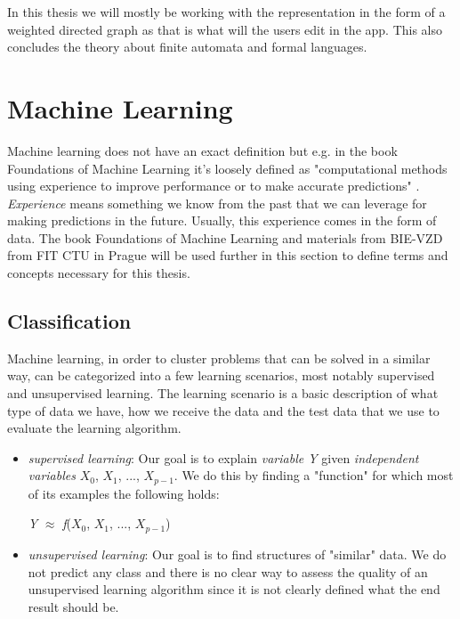 In this thesis we will mostly be working with the representation in the form of a weighted directed graph as that is what will the users edit in the app.
This also concludes the theory about finite automata and formal languages.

\section{Machine Learning}

Machine learning does not have an exact definition but e.g. in the book Foundations of Machine Learning it's loosely defined as "computational methods using experience to improve performance or to make accurate predictions" \cite{ml-foundations}. \textit{Experience} means something we know from the past that we can leverage for making predictions in the future. Usually, this experience comes in the form of data. The book Foundations of Machine Learning \cite{ml-foundations} and materials from BIE-VZD from FIT CTU in Prague \cite{vzd-lectures} will be used further in this section to define terms and concepts necessary for this thesis.

\subsection{Classification}

Machine learning, in order to cluster problems that can be solved in a similar way, can be categorized into a few learning scenarios, most notably supervised and unsupervised learning. The learning scenario is a basic description of what type of data we have, how we receive the data and the test data that we use to evaluate the learning algorithm.

\begin{itemize}
    \item \textit{supervised learning}: Our goal is to explain \textit{variable Y} given \textit{independent variables} $\textit{X}_0$, $\textit{X}_1$, ..., $\textit{X}_{\textit{p} - 1}$. We do this by finding a "function" for which most of its examples the following holds:\\
    \centerline{\textit{Y} $\approx$ \textit{f}($\textit{X}_0$, $\textit{X}_1$, ..., $\textit{X}_{\textit{p} - 1}$)}
    \item \textit{unsupervised learning}: Our goal is to find structures of "similar" data. We do not predict any class and there is no clear way to assess the quality of an unsupervised learning algorithm since it is not clearly defined what the end result should be.
\end{itemize}

